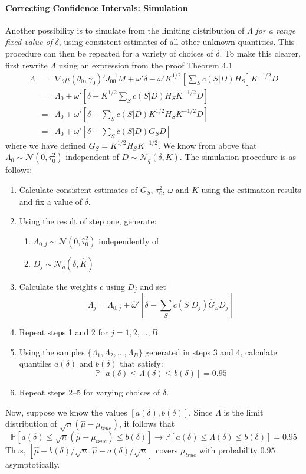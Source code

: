 \documentclass[12pt]{article}
\theoremstyle{definition}
\newcommand{\p}{\mathbb{P}}
\begin{document}
\paragraph{Correcting Confidence Intervals: Simulation} Another possibility is to simulate from the limiting distribution of $\Lambda$ \emph{for a range fixed value of} $\delta$, using consistent estimates of all other unknown quantities. This procedure can then be repeated for a variety of choices of $\delta$. To make this clearer, first rewrite $\Lambda$ using an expression from the proof Theorem 4.1
	\begin{eqnarray*}
		\Lambda &=&\nabla_{\theta}\mu(\theta_0, \gamma_0)'J_{00}^{-1}M+  \omega'\delta - \omega 'K^{1/2}\left[ \sum_S c(S|D)H_S\right] K^{-1/2}D \\
			&=& \Lambda_0 + \omega' \left[ \delta - K^{1/2} \sum_S c(S|D)H_S K^{-1/2}D \right]\\
			&=& \Lambda_0 + \omega' \left[ \delta - \sum_S c(S|D)K^{1/2} H_S K^{-1/2}D \right]\\
			&=& \Lambda_0 + \omega' \left[ \delta - \sum_S c(S|D)G_S D \right]
	\end{eqnarray*}
where we have defined $G_S = K^{1/2} H_S K^{-1/2}$. We know from above  that $\Lambda_0 \sim \mathcal{N}(0,\tau_0^2)$ independent of $D\sim \mathcal{N}_q(\delta,K)$. The simulation procedure is as follows:
		\begin{enumerate}
			\item Calculate consistent estimates of $G_S$, $\tau_0^2$, $\omega$ and $K$ using the estimation results and fix a value of $\delta$.
			\item Using the result of step one, generate:
				\begin{enumerate}
					\item $\Lambda_{0,j}\sim\mathcal{N}(0, \hat{\tau}^{2}_0)$ independently of
					\item  $D_j \sim \mathcal{N}_q(\delta, \hat{K})$
				\end{enumerate}
			\item Calculate the weights $c$ using $D_j$ and set 
				$$\Lambda_j = \Lambda_{0,j} + \hat{\omega}' \left[ \delta - \sum_S c(S|D_j)\hat{G}_S D_j \right]$$
		\item Repeat steps 1 and 2 for $j= 1, 2, \hdots, B$
		\item Using the samples $\{\Lambda_1, \Lambda_2, \hdots, \Lambda_B\}$ generated in steps 3 and 4, calculate quantiles $a(\delta)$ and $b(\delta)$ that satisfy:
			$$\p\left[ a(\delta) \leq \Lambda(\delta) \leq b(\delta) \right]= 0.95$$
		\item Repeat steps 2--5 for varying choices of $\delta$.
		\end{enumerate}
Now, suppose we know the values $[a(\delta), b(\delta)]$. Since $\Lambda$ is the limit distribution of $\sqrt{n}(\hat{\mu} - \mu_{true})$, it follows that
	$$\p\left[a(\delta)\leq \sqrt{n}(\hat{\mu} - \mu_{true}) \leq b(\delta)  \right]\rightarrow \p\left[a(\delta)\leq \Lambda(\delta) \leq b(\delta)  \right] = 0.95$$
Thus, $\left[\hat{\mu} - b(\delta)/\sqrt{n}, \hat{\mu} - a(\delta)/\sqrt{n}  \right]$ covers $\mu_{true}$ with probability $0.95$ asymptotically.
\end{document}
